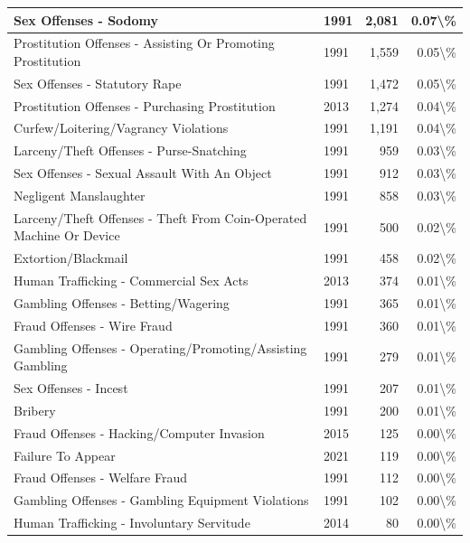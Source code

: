 \documentclass[
]{krantz}
\begin{document}
\begin{longtable}[t]{l|l|r|r}
\hline
Sex Offenses - Sodomy & 1991 & 2,081 & 0.07\textbackslash{}\%\\
\hline
Prostitution Offenses - Assisting Or Promoting Prostitution & 1991 & 1,559 & 0.05\textbackslash{}\%\\
\hline
Sex Offenses - Statutory Rape & 1991 & 1,472 & 0.05\textbackslash{}\%\\
\hline
Prostitution Offenses - Purchasing Prostitution & 2013 & 1,274 & 0.04\textbackslash{}\%\\
\hline
Curfew/Loitering/Vagrancy Violations & 1991 & 1,191 & 0.04\textbackslash{}\%\\
\hline
Larceny/Theft Offenses - Purse-Snatching & 1991 & 959 & 0.03\textbackslash{}\%\\
\hline
Sex Offenses - Sexual Assault With An Object & 1991 & 912 & 0.03\textbackslash{}\%\\
\hline
Negligent Manslaughter & 1991 & 858 & 0.03\textbackslash{}\%\\
\hline
Larceny/Theft Offenses - Theft From Coin-Operated Machine Or Device & 1991 & 500 & 0.02\textbackslash{}\%\\
\hline
Extortion/Blackmail & 1991 & 458 & 0.02\textbackslash{}\%\\
\hline
Human Trafficking - Commercial Sex Acts & 2013 & 374 & 0.01\textbackslash{}\%\\
\hline
Gambling Offenses - Betting/Wagering & 1991 & 365 & 0.01\textbackslash{}\%\\
\hline
Fraud Offenses - Wire Fraud & 1991 & 360 & 0.01\textbackslash{}\%\\
\hline
Gambling Offenses - Operating/Promoting/Assisting Gambling & 1991 & 279 & 0.01\textbackslash{}\%\\
\hline
Sex Offenses - Incest & 1991 & 207 & 0.01\textbackslash{}\%\\
\hline
Bribery & 1991 & 200 & 0.01\textbackslash{}\%\\
\hline
Fraud Offenses - Hacking/Computer Invasion & 2015 & 125 & 0.00\textbackslash{}\%\\
\hline
Failure To Appear & 2021 & 119 & 0.00\textbackslash{}\%\\
\hline
Fraud Offenses - Welfare Fraud & 1991 & 112 & 0.00\textbackslash{}\%\\
\hline
Gambling Offenses - Gambling Equipment Violations & 1991 & 102 & 0.00\textbackslash{}\%\\
\hline
Human Trafficking - Involuntary Servitude & 2014 & 80 & 0.00\textbackslash{}\%\\

\end{longtable}
\end{document}
